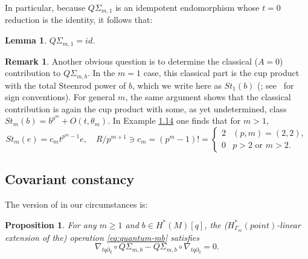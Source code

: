 \documentclass[10pt,a4paper]{amsart}
\theoremstyle{plain}
\newtheorem{lemma}[theorem]{Lemma}
\newtheorem{proposition}[theorem]{Proposition}
\theoremstyle{definition}
\newtheorem{remark}[theorem]{Remark}
\begin{document}
In particular, because $Q\Sigma_{m,1}$ is an idempotent endomorphism whose $t = 0$ reduction is the identity, it follows that:

\begin{lemma} \label{th:unitality}
$Q\Sigma_{m,1} = \mathit{id}$.
\end{lemma}

\begin{remark}
Another obvious question is to determine the classical ($A = 0$) contribution to $Q\Sigma_{m,b}$. In the $m = 1$ case, this classical part is the cup product with the total Steenrod power of $b$, which we write here as $\mathit{St}_1(b)$ (\cite[Lem.\,4.6]{seidel-wilkins21}; see~\cite{seidel23} for sign conventions). For general $m$, the same argument shows that the classical contribution is again the cup product with some, as yet undetermined, class $\mathit{St}_m(b) = b^{p^m} + O(t,\theta_m)$. In Example \href{https://jep.centre-mersenne.org/articles/10.5802/jep.324/}{1.14} one finds that for $m>1$,
\begin{equation*}
\mathit{St}_m(e) = c_m t^{p^m-1}e, \quad
R/p^{m+1} \ni c_m = (p^m-1)! = \begin{cases} 2 & (p,m) = (2,2), \\
0 & \text{$p>2$ or $m>2$.} \end{cases}
\end{equation*}
\end{remark}

\subsection{Covariant constancy}
The version of \cite[Th.\,1.4]{seidel-wilkins21} in our circumstances is:

\begin{proposition} \label{th:covariantly-constant}
For any $m \geq 1$ and $b \in H^*(M)[q]$, the ($H^*_{\Gamma_m}(\mathit{point})$-linear extension of the) operation \eqref{eq:quantum-mb} satisfies
\begin{equation}\label{eq:derivative-of-qsigma}
\nabla_{tq\partial_q} \circ Q\Sigma_{m,b} - Q\Sigma_{m,b} \circ \nabla_{tq\partial_q} = 0.
\end{equation}
\end{proposition}
\end{document}
